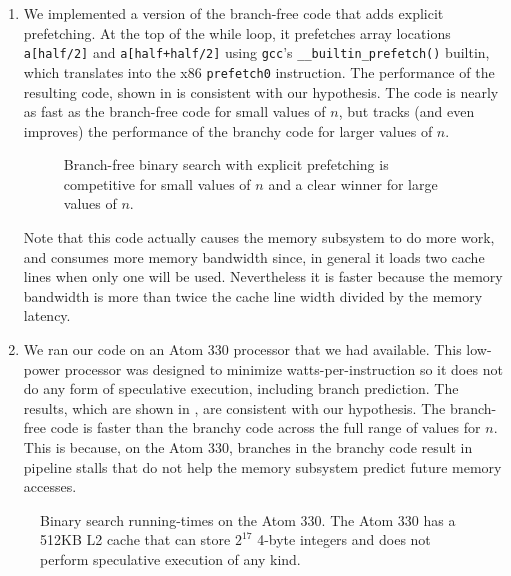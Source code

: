 \documentclass{patmorin}
\begin{document}
\begin{enumerate}
\item We implemented a version of the branch-free code that adds explicit
   prefetching. At the top of the while loop, it
   prefetches array locations \texttt{a[half/2]}
   and \texttt{a[half+half/2]} using \texttt{gcc}'s
   \texttt{__builtin_prefetch()} builtin, which translates into
   the x86 \texttt{prefetch0} instruction.  The performance of
   the resulting code, shown in  is consistent with our
   hypothesis.  The code is nearly as fast as the branch-free code for
   small values of $n$, but tracks (and even improves) the performance
   of the branchy code for larger values of $n$.

\begin{figure}
   \caption{Branch-free binary search with explicit prefetching is competitive
    for small values of $n$ and a clear winner for large values of $n$.}
\end{figure}

   Note that this code actually causes the memory subsystem to do more
   work, and consumes more memory bandwidth since, in general it loads
   two cache lines when only one will be used.  Nevertheless it is faster
   because the memory bandwidth is more than twice the cache line width
   divided by the memory latency.

\item We ran our code on an Atom 330 processor that we had available. This
   low-power processor was designed to minimize watts-per-instruction
   so it does not do any form of speculative execution, including
   branch prediction. The results, which are shown in ,
   are consistent with our hypothesis.  The branch-free code is faster
   than the branchy code across the full range of values for $n$.
   This is because, on the Atom 330, branches in the branchy code result
   in pipeline stalls that do not help the memory subsystem predict
   future memory accesses.
\end{enumerate}

\begin{figure}
   \caption{Binary search running-times on the Atom 330. The Atom 330
   has a 512KB L2 cache that can store $2^{17}$ 4-byte integers and does
   not perform speculative execution of any kind.}
\end{figure}
\end{document}
